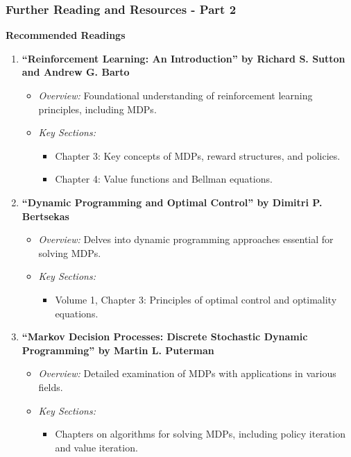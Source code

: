 \documentclass[aspectratio=169]{beamer}
\begin{document}
\begin{frame}[fragile]
    \frametitle{Further Reading and Resources - Part 2}
    \textbf{Recommended Readings}
    
    \begin{enumerate}
        \item \textbf{``Reinforcement Learning: An Introduction'' by Richard S. Sutton and Andrew G. Barto}
        \begin{itemize}
            \item \textit{Overview:} Foundational understanding of reinforcement learning principles, including MDPs.
            \item \textit{Key Sections:}
            \begin{itemize}
                \item Chapter 3: Key concepts of MDPs, reward structures, and policies.
                \item Chapter 4: Value functions and Bellman equations.
            \end{itemize}
        \end{itemize}
        
        \item \textbf{``Dynamic Programming and Optimal Control'' by Dimitri P. Bertsekas}
        \begin{itemize}
            \item \textit{Overview:} Delves into dynamic programming approaches essential for solving MDPs.
            \item \textit{Key Sections:}
            \begin{itemize}
                \item Volume 1, Chapter 3: Principles of optimal control and optimality equations.
            \end{itemize}
        \end{itemize}
        
        \item \textbf{``Markov Decision Processes: Discrete Stochastic Dynamic Programming'' by Martin L. Puterman}
        \begin{itemize}
            \item \textit{Overview:} Detailed examination of MDPs with applications in various fields.
            \item \textit{Key Sections:}
            \begin{itemize}
                \item Chapters on algorithms for solving MDPs, including policy iteration and value iteration.
            \end{itemize}
        \end{itemize}
    \end{enumerate}
\end{frame}
\end{document}
